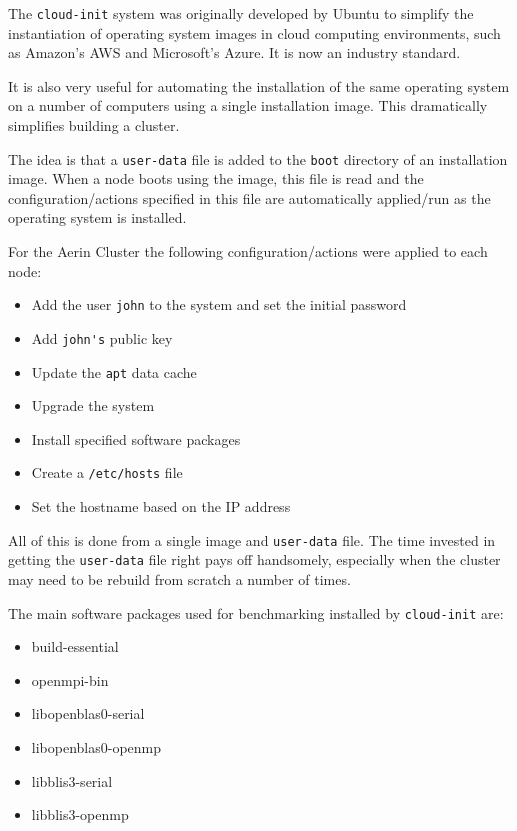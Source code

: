 \documentclass{report}
\begin{document}
The \verb|cloud-init| system was originally developed by Ubuntu to simplify the instantiation of operating system images in cloud computing environments, such as Amazon's AWS and Microsoft's Azure. It is now an industry standard.

It is also very useful for automating the installation of the same operating system on a number of computers using a single installation image. This dramatically simplifies building a cluster.

The idea is that a \verb|user-data| file is added to the \verb|boot| directory of an installation image. When a node boots using the image, this file is read and the configuration/actions specified in this file are automatically applied/run as the operating system is installed.

For the Aerin Cluster the following configuration/actions were applied to each node:

\begin{itemize}
\item Add the user \verb|john| to the system and set the initial password 
\item Add \verb|john's| public key
\item Update the \verb|apt| data cache
\item Upgrade the system
\item Install specified software packages
\item Create a \verb|/etc/hosts| file
\item Set the hostname based on the IP address
\end{itemize}

All of this is done from a single image and \verb|user-data| file. The time invested in getting the \verb|user-data| file right pays off handsomely, especially when the cluster may need to be rebuild from scratch a number of times.

The main software packages used for benchmarking installed by \verb|cloud-init| are:

\begin{itemize}
\item build-essential
\item openmpi-bin
\item libopenblas0-serial
\item libopenblas0-openmp
\item libblis3-serial
\item libblis3-openmp
\end{itemize}
\end{document}

